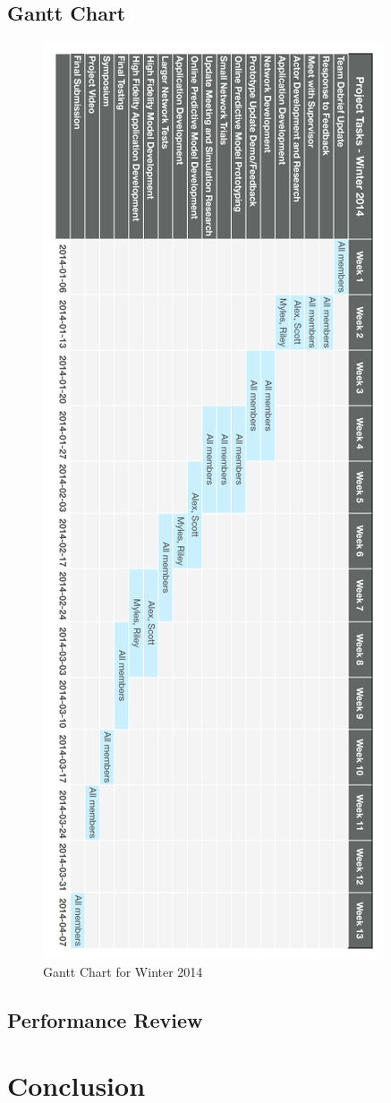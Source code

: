 \documentclass{report}
\begin{document}
\subsection{Gantt Chart}
\begin{figure}[H]
  \begin{centering}
    \includegraphics[scale=0.5, angle=180]{figures/gantt-vertical.png}
    \caption{Gantt Chart for Winter 2014}
    \label{fig:gantt-winter}
  \end{centering}
\end{figure}

\subsection{Performance Review}

\newpage
\section{Conclusion}

\newpage
{}




\end{document}
